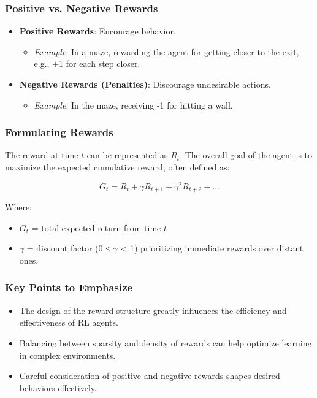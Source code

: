 \documentclass[aspectratio=169]{beamer}
\begin{document}
\begin{frame}[fragile]
    \frametitle{Positive vs. Negative Rewards}

    \begin{itemize}
        \item \textbf{Positive Rewards}: Encourage behavior.
            \begin{itemize}
                \item \textit{Example}: In a maze, rewarding the agent for getting closer to the exit, e.g., +1 for each step closer.
            \end{itemize}
        
        \item \textbf{Negative Rewards (Penalties)}: Discourage undesirable actions.
            \begin{itemize}
                \item \textit{Example}: In the maze, receiving -1 for hitting a wall.
            \end{itemize}
    \end{itemize}
\end{frame}

\begin{frame}[fragile]
    \frametitle{Formulating Rewards}

    The reward at time \( t \) can be represented as \( R_t \). The overall goal of the agent is to maximize the expected cumulative reward, often defined as:

    \begin{equation}
        G_t = R_t + \gamma R_{t+1} + \gamma^2 R_{t+2} + \ldots
    \end{equation}

    Where:
    \begin{itemize}
        \item \( G_t \) = total expected return from time \( t \)
        \item \( \gamma \) = discount factor (0 ≤ \( \gamma \) < 1) prioritizing immediate rewards over distant ones.
    \end{itemize}
\end{frame}

\begin{frame}[fragile]
    \frametitle{Key Points to Emphasize}

    \begin{itemize}
        \item The design of the reward structure greatly influences the efficiency and effectiveness of RL agents.
        \item Balancing between sparsity and density of rewards can help optimize learning in complex environments.
        \item Careful consideration of positive and negative rewards shapes desired behaviors effectively.
    \end{itemize}
\end{frame}
\end{document}
